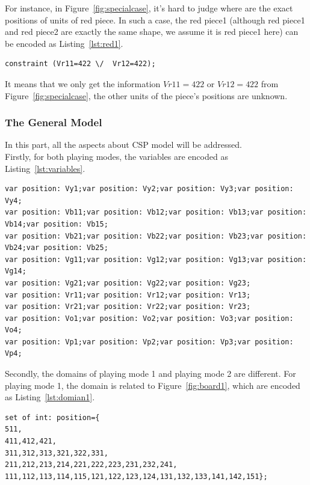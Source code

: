For instance, in Figure~\ref{fig:specialcase}, it's hard to judge where are the exact positions of units of red piece. In such a case, the red piece1 (although red piece1 and red piece2 are exactly the same shape, we assume it is red piece1 here) can be encoded as Listing~\ref{lst:red1}.
\begin{lstlisting}[language=minizinc,numbers=none,caption={Encoding for red piece1's position of special problem},label={lst:red1}]
constraint (Vr11=422 \/  Vr12=422);
\end{lstlisting}
\bigskip
\smallbreak
It means that we only get the information $Vr11=422$ or $Vr12=422$ from Figure~\ref{fig:specialcase}, the other units of the piece's positions are unknown.
\subsubsection{The General Model}
In this part, all the aspects about CSP model will be addressed.
\\Firstly, for both playing modes, the variables are encoded as Listing~\ref{lst:variables}.
\begin{lstlisting}[language=minizinc,numbers=none,caption={Encoding for variables},label={lst:variables}]
var position: Vy1;var position: Vy2;var position: Vy3;var position: Vy4;
var position: Vb11;var position: Vb12;var position: Vb13;var position: Vb14;var position: Vb15;
var position: Vb21;var position: Vb22;var position: Vb23;var position: Vb24;var position: Vb25;
var position: Vg11;var position: Vg12;var position: Vg13;var position: Vg14;
var position: Vg21;var position: Vg22;var position: Vg23;
var position: Vr11;var position: Vr12;var position: Vr13;
var position: Vr21;var position: Vr22;var position: Vr23;
var position: Vo1;var position: Vo2;var position: Vo3;var position: Vo4;
var position: Vp1;var position: Vp2;var position: Vp3;var position: Vp4;
\end{lstlisting}
\bigskip
\smallbreak
Secondly, the domains of playing mode 1 and playing mode 2 are different. For playing mode 1, the domain is related to Figure~\ref{fig:board1}, which are encoded as Listing~\ref{lst:domian1}.
\begin{lstlisting}[language=minizinc,numbers=none,caption={Encoding for the domain of playing mode 1},label={lst:domian1}]
set of int: position={
511,
411,412,421,
311,312,313,321,322,331,
211,212,213,214,221,222,223,231,232,241,
111,112,113,114,115,121,122,123,124,131,132,133,141,142,151};
\end{lstlisting}
\bigskip
\smallbreak
